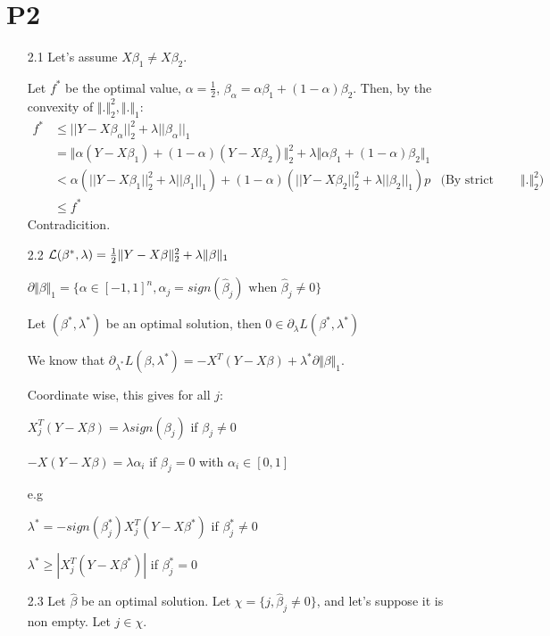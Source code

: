 \documentclass[12pt]{article}
\newcommand{\norm}[1]{\Vert #1 \Vert}
\begin{document}
\section*{P2}
\begin{itemize}
\item[2.1]
  Let's assume  $X\beta_1 \ne X\beta_2$.
  
  Let $f^*$ be the optimal value, $\alpha = \frac12$, $\beta_{\alpha} = \alpha \beta_1 + (1-\alpha) \beta_2$.
  Then, by the convexity of $\norm{.}_2^2, \norm{.}_1$:
  \begin{align*}
    f^* &\le ||Y - X \beta_{\alpha}||_2^2 + \lambda ||\beta_{\alpha}||_1
    \\&= \norm{ \alpha (Y - X \beta_1) + (1-\alpha)(Y - X\beta_2)}_2^2
        + \lambda \norm{\alpha \beta_1 + (1-\alpha)\beta_2}_1
    \\&<
        \alpha \left(||Y - X \beta_1||_2^2 + \lambda ||\beta_1||_1\right)
        + (1-\alpha)\left(||Y - X \beta_2||_2^2 + \lambda ||\beta_2||_1\right)p
        &\text{(By strict convexity of $\norm{.}_2^2$)}
    \\&\le f^*
  \end{align*}
  Contradicition.
  
\item[2.2]
  ${\cal L}(\beta^*, \lambda) = \frac12 \norm{Y-X\beta}_2^2 + \lambda \norm{\beta}_1$

  $\partial \norm{\beta}_1 = \{ \alpha \in [-1, 1]^n, \alpha_j = sign(\hat \beta_j) \text{ when } \hat \beta_j \ne 0\}$
  
  Let $(\beta^*, \lambda^*)$ be an optimal solution, then $0 \in \partial_{\lambda} L (\beta^*, \lambda^*)$

  We know that $\partial_{\lambda^*} L (\beta, \lambda^*) =  -X^T(Y-X\beta) +  \lambda^* \partial \norm{\beta}_1$.

  Coordinate wise, this gives for all $j$:
  
  $ X_j^T (Y - X\beta) = \lambda sign(\beta_j)$ if $\beta_j \ne 0$
  
  $ - X (Y - X\beta) = \lambda \alpha_i$ if $\beta_j = 0$ with $\alpha_i \in [0, 1]$
  
  e.g
  
  $ \lambda^* = -sign(\beta_j^*) X_j^T(Y - X\beta^*)$ if $\beta_j^* \ne 0$
  
  $ \lambda^* \ge | X_j^T(Y - X\beta^*)|$ if $\beta_j^* = 0$
  

  
\item[2.3]
  Let $\hat \beta$ be an optimal solution. Let $\chi = \{ j, \hat \beta_j \ne 0 \}$, and let's suppose it is non empty.   Let $j \in \chi$.


\end{itemize}
\end{document}
